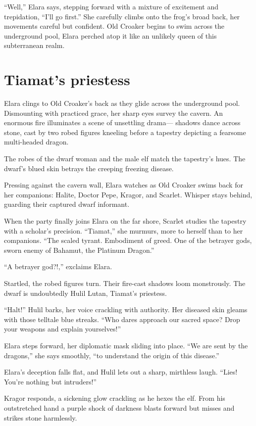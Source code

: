 \documentclass[
  letterpaper,12pt,twoside,twocolumn,openany,
  nodeprecatedcode,bg=full]{dndbook}
\begin{document}
``Well,'' Elara says, stepping forward with a mixture of excitement and
trepidation, ``I'll go first.'' She carefully climbs onto the frog's
broad back, her movements careful but confident. Old Croaker begins to
swim across the underground pool, Elara perched atop it like an unlikely
queen of this subterranean realm.

\section{Tiamat's priestess}\label{tiamats-priestess}

Elara clings to Old Croaker's back as they glide across the underground
pool. Dismounting with practiced grace, her sharp eyes survey the
cavern. An enormous fire illuminates a scene of unsettling drama---
shadows dance across stone, cast by two robed figures kneeling before a
tapestry depicting a fearsome multi-headed dragon.

The robes of the dwarf woman and the male elf match the tapestry's hues.
The dwarf's blued skin betrays the creeping freezing disease.

Pressing against the cavern wall, Elara watches as Old Croaker swims
back for her companions: Halite, Doctor Pepe, Kragor, and Scarlet.
Whisper stays behind, guarding their captured dwarf informant.

When the party finally joins Elara on the far shore, Scarlet studies the
tapestry with a scholar's precision. ``Tiamat,'' she murmurs, more to
herself than to her companions. ``The scaled tyrant. Embodiment of
greed. One of the betrayer gods, sworn enemy of Bahamut, the Platinum
Dragon.''

``A betrayer god?!,'' exclaims Elara.

Startled, the robed figures turn. Their fire-cast shadows loom
monstrously. The dwarf is undoubtedly Hulil Lutan, Tiamat's priestess.

``Halt!'' Hulil barks, her voice crackling with authority. Her diseased
skin gleams with those telltale blue streaks. ``Who dares approach our
sacred space? Drop your weapons and explain yourselves!''

Elara steps forward, her diplomatic mask sliding into place. ``We are
sent by the dragons,'' she says smoothly, ``to understand the origin of
this disease.''

Elara's deception falls flat, and Hulil lets out a sharp, mirthless
laugh. ``Lies! You're nothing but intruders!''

Kragor responds, a sickening glow crackling as he hexes the elf. From
his outstretched hand a purple shock of darkness blasts forward but
misses and strikes stone harmlessly.
\end{document}
